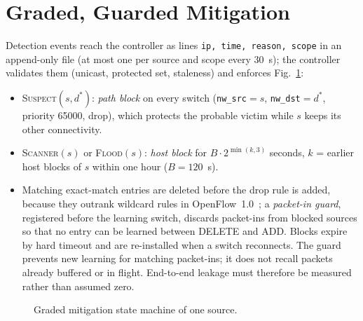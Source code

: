 \documentclass[conference]{IEEEtran}
\newcommand{\cmd}[1]{\texttt{#1}}
\begin{document}
\section{Graded, Guarded Mitigation}\label{sec:mitig}
Detection events reach the controller as lines \cmd{ip, time, reason, scope} in an append-only file (at most one per
source and scope every 30~s); the controller validates them (unicast, protected set, staleness) and enforces
Fig.~\ref{fig:fsm}:
\begin{itemize}
\item \textsc{Suspect}$(s,d^*)$: \emph{path block} on every switch (\cmd{nw\_src}$=s$, \cmd{nw\_dst}$=d^*$, priority
65000, drop), which protects the probable victim while $s$ keeps its other connectivity.
\item \textsc{Scanner}$(s)$ or \textsc{Flood}$(s)$: \emph{host block} for $B\cdot2^{\min(k,3)}$ seconds, $k$ = earlier
host blocks of $s$ within one hour ($B=120$~s).
\item Matching exact-match entries are deleted before the drop rule is added, because they outrank wildcard rules in
OpenFlow~1.0~\cite{onf2009of10}; a \emph{packet-in guard}, registered before the learning switch, discards packet-ins from
blocked sources so that no entry can be learned between DELETE and ADD. Blocks expire by hard timeout and are re-installed
when a switch reconnects. The guard prevents new learning for matching packet-ins; it does not recall packets
already buffered or in flight. End-to-end leakage must therefore be measured rather than assumed zero.
\end{itemize}

\begin{figure}[!tb]
\centering
{}
\caption{Graded mitigation state machine of one source.}\label{fig:fsm}
\end{figure}
\end{document}
